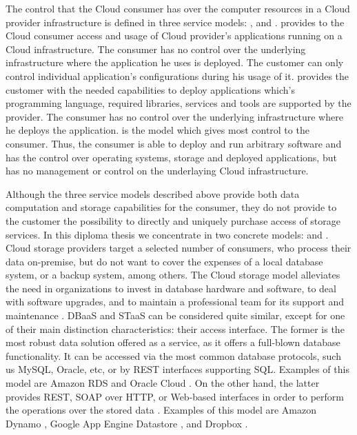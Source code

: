 The control that the Cloud consumer has over the computer resources in a Cloud provider infrastructure is defined in three service models: ,  and .  provides to the Cloud consumer access and usage of Cloud provider's applications running on a Cloud infrastructure. The consumer has no control over the underlying infrastructure where the application he uses is deployed. The customer can only control individual application's configurations during his usage of it.  provides the customer with the needed capabilities to deploy applications which's programming language, required libraries, services and tools are supported by the provider. The consumer has no control over the underlying infrastructure where he deploys the application.  is the model which gives most control to the consumer. Thus, the consumer is able to deploy and run arbitrary software and has the control over operating systems, storage and deployed applications, but has no management or control on the underlaying Cloud infrastructure. 

Although the three service models described above provide both data computation and storage capabilities for the consumer, they do not provide to the customer the possibility to directly and uniquely purchase access of storage services. In this diploma thesis we concentrate in two concrete models:  and . Cloud storage providers target a selected number of consumers, who process their data on-premise, but do not  want to cover the expenses of a local database system, or a backup system, among others. The Cloud storage model alleviates the need in organizations to invest in database hardware and software, to deal with software upgrades, and to maintain a professional team for its support and maintenance \cite{dbaasIyer}.  \ac{DBaaS} and \ac{STaaS} can be considered quite similar, except for one of their main distinction characteristics: their access interface. The former is the most robust data solution offered as a service, as it offers a full-blown database functionality. It can be accessed via the most common database protocols, such us MySQL, Oracle, etc, or by REST interfaces supporting \ac{SQL}. Examples of this model are Amazon RDS \cite{amazonrds} and Oracle Cloud \cite{oraclecloud}. On the other hand, the latter provides REST, \ac{SOAP} over \ac{HTTP}, or Web-based interfaces in order to perform the operations over the stored data \cite{cloudstorageWU}. Examples of this model are Amazon Dynamo \cite{amazondynamodb} , Google App Engine Datastore \cite{googleappdatastore}, and Dropbox \cite{dropbox}.

